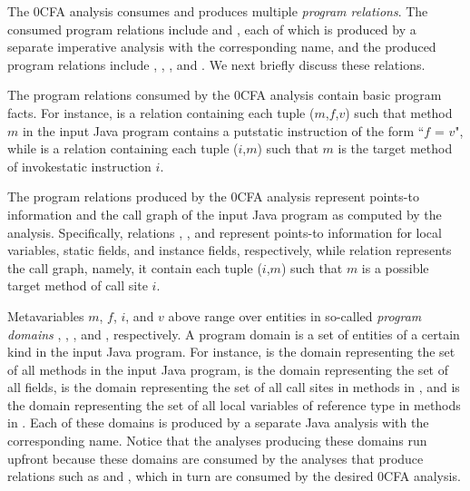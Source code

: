 The 0CFA analysis consumes and produces multiple {\it program
relations}.  The consumed program relations include 
and , each of which is produced by a separate imperative analysis with
the corresponding name, and the produced program relations include
, , , and .  We next briefly
discuss these relations.

The program relations consumed by the 0CFA analysis contain basic program facts.  For instance,
 is a relation containing each tuple ($m$,$f$,$v$) such that method $m$ in the input Java
program contains a putstatic instruction of the form ``$f$ = $v$",
while  is a relation containing each tuple ($i$,$m$) such that $m$
is the target method of invokestatic instruction $i$.

The program relations produced by the 0CFA analysis represent points-to information and the
call graph of the input Java program as computed by the analysis.
Specifically, relations , , and  represent points-to information
for local variables, static fields, and instance fields, respectively,
while relation  represents the call graph, namely, it contain each tuple ($i$,$m$) such that
$m$ is a possible target method of call site $i$.

Metavariables $m$, $f$, $i$, and $v$ above range over entities in so-called {\it program domains} ,
, , and , respectively.
A program domain is a set of entities of a certain kind in the input Java program.  For instance,
 is the domain representing
the set of all methods in the input Java program,  is the domain representing the set of all fields,
 is the domain representing
the set of all call sites in methods in , and  is the domain representing the set of all local variables of reference type in methods in .
Each of these domains is produced by a separate Java analysis with the corresponding name.
Notice that the analyses producing these domains run upfront because these domains
are consumed by the analyses that produce relations such as  and
, which in turn are consumed by the desired 0CFA analysis.

